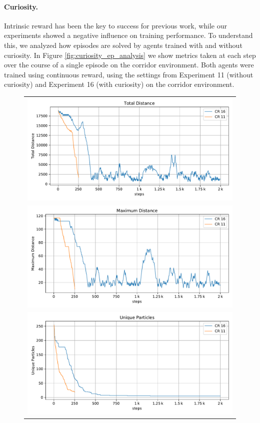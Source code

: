 \paragraph{Curiosity.} Intrinsic reward has been the key to success for previous work, while our experiments showed a negative influence on training performance. To understand this, we analyzed how episodes are solved by agents trained with and without curiosity. In Figure \ref{fig:curiosity_ep_analysis} we show metrics taken at each step over the course of a single episode on the corridor environment. Both agents were trained using continuous reward, using the settings from Experiment 11 (without curiosity) and Experiment 16 (with curiosity) on the corridor environment. 

\begin{figure}[htp]
    \begin{center}
        \begin{tabular}{c}
            \includegraphics[clip, width=0.75\columnwidth]{figures/evaluation/rewards/episode_analysis/curiosity_total_distance.pdf} \\
            \includegraphics[clip, width=0.75\columnwidth]{figures/evaluation/rewards/episode_analysis/curiosity_max_distance.pdf} \\
            \includegraphics[clip, width=0.75\columnwidth]{figures/evaluation/rewards/episode_analysis/curiosity_unique_particles.pdf} \\

\end{tabular}
\end{center}
\end{figure}
